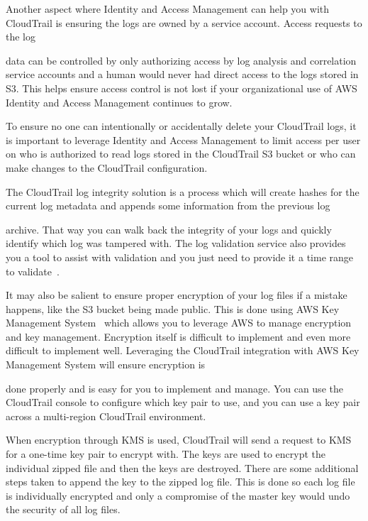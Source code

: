 Another aspect where Identity and Access Management can help you with
CloudTrail 
is ensuring the logs are owned by a service account. Access requests to the log

data can be controlled by only authorizing access by log analysis and
correlation 
service accounts and a human would never had direct access to the logs stored
in 
S3. This helps ensure access control is not lost if your organizational use of 
AWS Identity and Access Management continues to grow. 

To ensure no one can intentionally or accidentally delete your CloudTrail logs,
 it is important to leverage Identity and Access Management to limit access 
per user on who is authorized to read logs stored in the CloudTrail S3 bucket 
or who can make changes to the CloudTrail configuration. 

The CloudTrail log integrity solution is a process which will create hashes 
for the current log metadata and appends some information from the previous log

archive. That way you can walk back the integrity of your logs and quickly 
identify which log was tampered with. The log validation service also provides 
you a tool to assist with validation and you just need to provide it a time 
range to validate~\cite{hid-sp18-518-CloudTrail-log-sharing}.

It may also be salient to ensure proper encryption of your log files if a
mistake
happens, like the S3 bucket being made public. This is done using AWS Key
Management System~\cite{hid-sp18-518-CloudTrail-KMS} which allows you to 
leverage AWS to manage encryption and key management. Encryption itself is 
difficult to implement and even more difficult to implement well. Leveraging
the 
CloudTrail integration with AWS Key Management System will ensure encryption is

done properly and is easy for you to implement and manage. You can use the 
CloudTrail console to configure which key pair to use, and you can use a key
pair
across a multi-region CloudTrail environment.

When encryption through KMS is used, CloudTrail will send a request to KMS for
a
one-time key pair to encrypt with. The keys are used to encrypt the individual
zipped file and then the keys are destroyed. There are some additional steps
taken
to append the key to the zipped log file. This is done so each log file is 
individually encrypted and only a compromise of the master key would undo the 
security of all log files.

